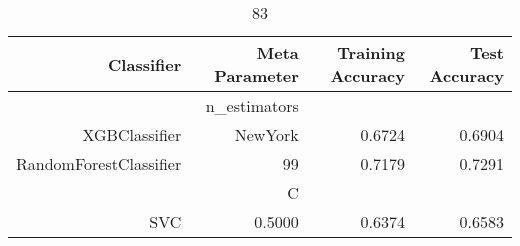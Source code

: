 
\begin{table}[H]
    \caption{83}
    \centering
    \begin{tabular}{|r|r|r|r|}
        \hline
        Classifier &Meta Parameter &Training Accuracy
        &Test Accuracy\\
        \hline
        &n\_estimators &\multicolumn{2}{|r|}{}\\
        \hline
        XGBClassifier &NewYork &0.6724 &0.6904\\
        \hline
        RandomForestClassifier &99 &0.7179 &0.7291\\
        \hline
        &C &\multicolumn{2}{|r|}{}\\
        \hline
        SVC &0.5000 &0.6374 &0.6583\\
        \hline
    \end{tabular}
\end{table}
